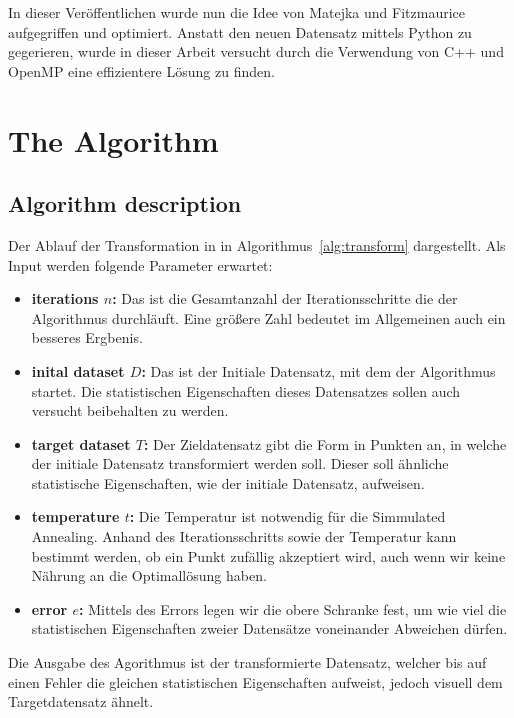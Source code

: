 \documentclass[sigconf]{acmart}
\begin{document}
In dieser Veröffentlichen wurde nun die Idee von Matejka und Fitzmaurice aufgegriffen und optimiert. Anstatt den neuen Datensatz mittels Python zu gegerieren, wurde in dieser Arbeit versucht durch die Verwendung von C++ und OpenMP eine effizientere Lösung zu finden.  




\section{The Algorithm}\label{sec:algo}

\subsection{Algorithm description}\label{sec:algo:desc}

Der Ablauf der Transformation in in Algorithmus~\ref{alg:transform} dargestellt. Als Input werden folgende Parameter erwartet:
\begin{itemize}
  \item \textbf{iterations $n$:} Das ist die Gesamtanzahl der Iterationsschritte die der Algorithmus durchläuft. Eine größere Zahl bedeutet im Allgemeinen auch ein besseres Ergbenis.
  \item \textbf{inital dataset $D$:} Das ist der Initiale Datensatz, mit dem der Algorithmus startet. Die statistischen Eigenschaften dieses Datensatzes sollen auch versucht beibehalten zu werden.
  \item \textbf{target dataset $T$:} Der Zieldatensatz gibt die Form in Punkten an, in welche der initiale Datensatz transformiert werden soll. Dieser soll ähnliche statistische Eigenschaften, wie der initiale Datensatz, aufweisen.
  \item \textbf{temperature $t$:} Die Temperatur ist notwendig für die Simmulated Annealing. Anhand des Iterationsschritts sowie der Temperatur kann bestimmt werden, ob ein Punkt zufällig akzeptiert wird, auch wenn wir keine Nährung an die Optimallösung haben.
  \item \textbf{error $e$:} Mittels des Errors legen wir die obere Schranke fest, um wie viel die statistischen Eigenschaften zweier Datensätze voneinander Abweichen dürfen.
\end{itemize}

Die Ausgabe des Agorithmus ist der transformierte Datensatz, welcher bis auf einen Fehler die gleichen statistischen Eigenschaften aufweist, jedoch visuell dem Targetdatensatz ähnelt. 
\end{document}
